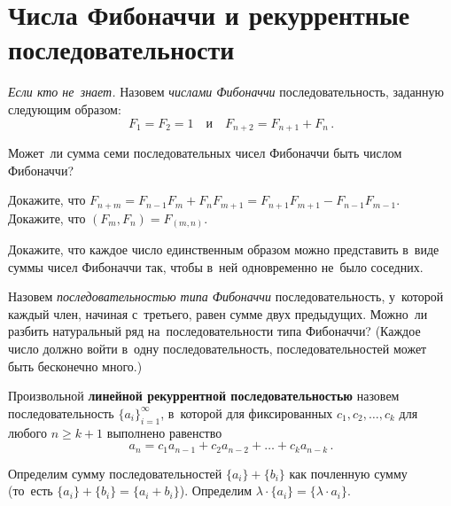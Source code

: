 
\section*{Числа Фибоначчи и рекуррентные последовательности}


\emph{Если кто не~знает.}
Назовем \emph{числами Фибоначчи} последовательность, заданную следующим
образом:
\[
    F_1 = F_2 = 1
\quad\text{и}\quad
    F_{n+2} = F_{n+1} + F_{n}
\, . \]

\begin{problems}

\item
Может~ли сумма семи последовательных чисел Фибоначчи быть числом Фибоначчи?

\item
\subproblem
Докажите, что\enspace
\(
    F_{n+m}
=
    F_{n-1} F_m + F_n F_{m+1}
=
    F_{n+1} F_{m+1} - F_{n-1} F_{m-1}
\).
\\
\subproblem
Докажите, что\enspace
$(F_{m}, F_{n}) = F_{(m, n)}$.

\item
Докажите, что каждое число единственным образом можно представить в~виде суммы
чисел Фибоначчи так, чтобы в~ней одновременно не~было соседних.

\item
Назовем \emph{последовательностью типа Фибоначчи} последовательность, у~которой
каждый член, начиная с~третьего, равен сумме двух предыдущих.
Можно~ли разбить натуральный ряд на~последовательности типа Фибоначчи?
(Каждое число должно войти в~одну последовательность, последовательностей может
быть бесконечно много.)

\end{problems}

Произвольной \textbf{линейной рекуррентной последовательностью} назовем
последовательность $\{ a_i \}_{i=1}^\infty$, в~которой для фиксированных
$c_1, c_2, \ldots, c_k$ для любого $n \geq k + 1$ выполнено равенство
\[
    a_{n} = c_1 a_{n-1} + c_2 a_{n-2} + \ldots + c_k a_{n-k}
\, . \]

Определим сумму последовательностей $\{ a_i \} + \{ b_i \}$ как почленную сумму
(то~есть $\{ a_i \} + \{ b_i \} = \{ a_i + b_i \}$).
Определим $\lambda \cdot \{ a_i \} = \{ \lambda \cdot a_i \}$.

